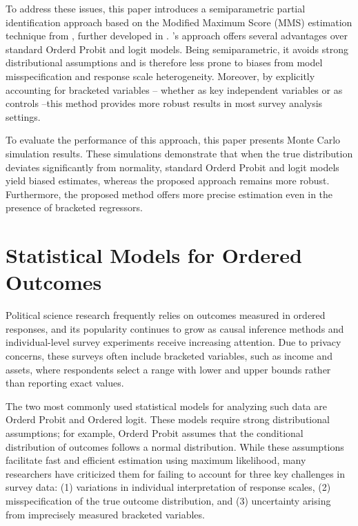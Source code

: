 \documentclass{article}
\begin{document}
To address these issues, this paper introduces a semiparametric partial identification approach based on the Modified Maximum Score (MMS) estimation technique from \citet{Manski2002a}, further developed in \citet{Wang2022a}. 
\citet{Wang2022a}'s approach offers several advantages over standard Orderd Probit and logit models. Being semiparametric, it avoids strong distributional assumptions and is therefore less prone to biases from model misspecification and response scale heterogeneity. Moreover, by explicitly accounting for bracketed variables -- whether as key independent variables or as controls --this method provides more robust results in most survey analysis settings.

To evaluate the performance of this approach, this paper presents Monte Carlo simulation results. These simulations demonstrate that when the true distribution deviates significantly from normality, standard Orderd Probit and logit models yield biased estimates, whereas the proposed approach remains more robust. Furthermore, the proposed method offers more precise estimation even in the presence of bracketed regressors. 

\section{Statistical Models for Ordered Outcomes}

Political science research frequently relies on outcomes measured in ordered responses, and its popularity continues to grow as causal inference methods and individual-level survey experiments receive increasing attention. Due to privacy concerns, these surveys often include bracketed variables, such as income and assets, where respondents select a range with lower and upper bounds rather than reporting exact values.

The two most commonly used statistical models for analyzing such data are Orderd Probit and Ordered logit. These models require strong distributional assumptions; for example, Orderd Probit assumes that the conditional distribution of outcomes follows a normal distribution. While these assumptions facilitate fast and efficient estimation using maximum likelihood, many researchers have criticized them for failing to account for three key challenges in survey data: (1) variations in individual interpretation of response scales, (2) misspecification of the true outcome distribution, and (3) uncertainty arising from imprecisely measured bracketed variables.
\end{document}
